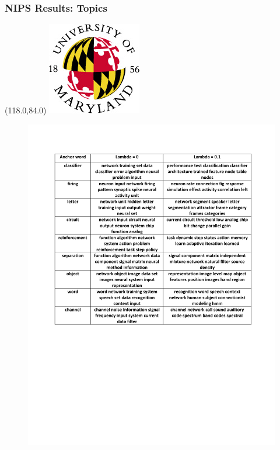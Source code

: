 \documentclass{beamer}
\let\oldframetitle\frametitle
\renewcommand{\frametitle}[1]{
\oldframetitle{#1}
\BottomLogo
}
\newcommand{\BottomLogo}{
\begin{textblock}{14}(118.0,84.0)
\includegraphics[height=.8cm]{figures/umd-logo1.jpg}
\end{textblock}
}
\begin{document}
\begin{frame}
\frametitle{NIPS Results: Topics}

\begin{figure}
\includegraphics[width=0.7\linewidth]{figures/NIPS_Beta_0_1.pdf}
\end{figure}

\end{frame}
\end{document}
